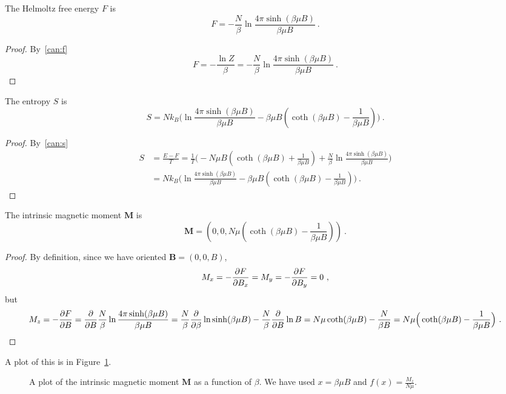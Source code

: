     The Helmoltz free energy $F$ is 
    \begin{equation*}
        F = - \frac{N}{\beta} \ln \frac{4 \pi \sinh (\beta \mu B)}{\beta \mu B} ~.
    \end{equation*}
    \begin{proof}
        By~\eqref{can:f}
        \begin{equation*}
            F = - \frac{\ln Z}{\beta} = - \frac{N}{\beta} \ln \frac{4 \pi \sinh (\beta \mu B)}{\beta \mu B} ~.
        \end{equation*}
    \end{proof}
    
    The entropy $S$ is 
    \begin{equation*}
        S = N k_B \Big ( \ln \frac{4 \pi \sinh (\beta \mu B)}{\beta \mu B}  - \beta \mu B (\coth (\beta \mu B) - \frac{1}{\beta \mu B} ) \Big ) ~.
    \end{equation*}
    \begin{proof}
        By~\eqref{can:s}
        \begin{equation*}
        \begin{aligned}
            S & = \frac{E - F}{T} = \frac{1}{T} \Big (- N \mu B (\coth (\beta \mu B) + \frac{1}{\beta \mu B} ) + \frac{N}{\beta} \ln \frac{4 \pi \sinh (\beta \mu B)}{\beta \mu B}  \Big ) \\ & = N k_B \Big ( \ln \frac{4 \pi \sinh (\beta \mu B)}{\beta \mu B}  - \beta \mu B (\coth (\beta \mu B) - \frac{1}{\beta \mu B} ) \Big )~. 
        \end{aligned}
        \end{equation*}
    \end{proof}

    The intrinsic magnetic moment $\mathbf M$ is 
    \begin{equation*}
        \mathbf M = (0, 0, N\mu (\coth(\beta \mu B) - \frac{1}{\beta \mu B})) ~.
    \end{equation*}
    \begin{proof}
        By definition, since we have oriented $\mathbf B = (0, 0, B)$,
        \begin{equation*}
            M_x = - \frac{\partial F}{\partial B_x} = M_y = - \frac{\partial F}{\partial B_y} = 0 ~,
        \end{equation*}
        but 
        \begin{equation*}
            M_z = - \frac{\partial F}{\partial B} = \frac{\partial}{\partial B} \frac{N}{\beta} \ln \frac{4 \pi \sinh (\beta \mu B)}{\beta \mu B} = \frac{N}{\beta} \frac{\partial}{\partial\beta} \ln \sinh (\beta \mu B) - \frac{N}{\beta} \frac{\partial}{\partial B} \ln B = N \mu \coth(\beta \mu B) - \frac{N}{\beta B} = N \mu \Big (\coth (\beta \mu B) - \frac{1}{\beta \mu B} \Big ) ~.
        \end{equation*}
    \end{proof}
    A plot of this is in Figure~\ref{can:mag}.
    \begin{figure}[h!]
        \centering
        \caption{A plot of the intrinsic magnetic moment $\mathbf M$ as a function of $\beta$. We have used $x = \beta \mu B$ and $f(x) = \frac{M_z}{N \mu}$.}
        \label{can:mag}
    \end{figure}

